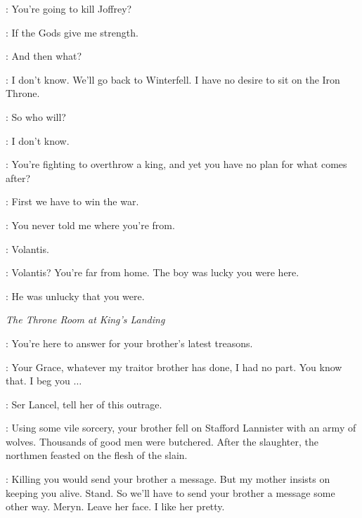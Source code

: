 \TALISA: You're going to kill Joffrey? 

\ROBB: If the Gods give me strength. 

\TALISA: And then what? 

\ROBB: I don't know. We'll go back to Winterfell. I have no desire to sit on the Iron Throne. 

\TALISA: So who will? 

\ROBB: I don't know. 

\TALISA: You're fighting to overthrow a king, and yet you have no plan for what comes after? 

\ROBB: First we have to win the war. 


\ROBB: You never told me where you're from. 

\TALISA: Volantis. 

\ROBB: Volantis? You're far from home. The boy was lucky you were here. 

\TALISA: He was unlucky that you were. 



\scene

\textit{The Throne Room at King's Landing} 


\JOFFREY: You're here to answer for your brother's latest treasons. 

\SANSA: Your Grace, whatever my traitor brother has done, I had no part. You know that. I beg you $\ldots$  

\JOFFREY: Ser Lancel, tell her of this outrage. 


\LANCEL: Using some vile sorcery, your brother fell on Stafford Lannister with an army of wolves. Thousands of good men were butchered. After the slaughter, the northmen feasted on the flesh of the slain. 


\JOFFREY: Killing you would send your brother a message. But my mother insists on keeping you alive. Stand. So we'll have to send your brother a message some other way. Meryn. Leave her face. I like her pretty. 


